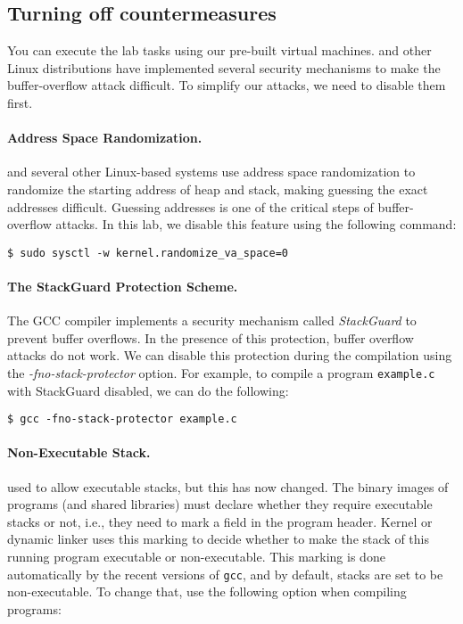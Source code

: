 \subsection{Turning off countermeasures}

You can execute the lab tasks using our pre-built \ubuntu virtual machines.
\ubuntu and other Linux distributions have implemented several
security mechanisms to make the buffer-overflow attack difficult.
To simplify our attacks, we need to disable them first.


\paragraph{Address Space Randomization.}
\ubuntu and several other Linux-based systems use address space
randomization to randomize the starting address of heap and
stack, making guessing the exact addresses difficult. Guessing
addresses is one of the critical steps of buffer-overflow attacks.  In
this lab, we disable this feature using the following command:

\begin{lstlisting}
$ sudo sysctl -w kernel.randomize_va_space=0
\end{lstlisting}




\paragraph{The StackGuard Protection Scheme.}
The GCC compiler implements a security mechanism called
\textit{StackGuard} to prevent buffer overflows. In the presence of this
protection, buffer overflow attacks do not work. We can disable this
protection during the compilation using the
\emph{-fno-stack-protector} option. For example, to compile a program
\texttt{example.c} with StackGuard disabled, we can do the following:


\begin{lstlisting}
$ gcc -fno-stack-protector example.c
\end{lstlisting}


\paragraph{Non-Executable Stack.} \ubuntu used to allow executable stacks,
but this has now changed. The binary images of programs (and shared
libraries) must declare whether they require executable stacks or not,
i.e., they need to mark a field in the program header. Kernel or dynamic
linker uses this marking to decide whether to make the stack of this
running program executable or non-executable. This marking is done
automatically by the recent versions of {\tt gcc}, and by default, 
stacks are set to be non-executable.  
To change that, use the following option when compiling programs:


